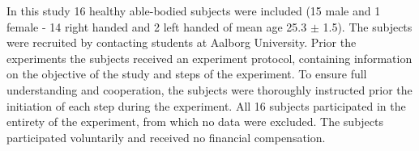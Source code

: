 In this study 16 healthy able-bodied subjects were included (15 male and 1 female - 14 right handed and 2 left handed of mean age 25.3 $\pm$ 1.5). The subjects were recruited by contacting students at Aalborg University. Prior the experiments the subjects received an experiment protocol, containing information on the objective of the study and steps of the experiment. To ensure full understanding and cooperation, the subjects were thoroughly instructed prior the initiation of each step during the experiment. All 16 subjects participated in the entirety of the experiment, from which no data were excluded. The subjects participated voluntarily and received no financial compensation.